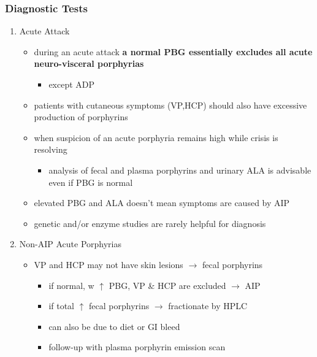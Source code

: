 \documentclass{scrartcl}
\begin{document}
\subsubsection{Diagnostic Tests}
\label{sec:orge03dab9}
\begin{enumerate}
\item Acute Attack
\label{sec:org96731fb}
\begin{itemize}
\item during an acute attack \textbf{a normal PBG essentially excludes all acute
neuro-visceral porphyrias}
\begin{itemize}
\item except ADP
\end{itemize}
\item patients with cutaneous symptoms (VP,HCP) should also have excessive
production of porphyrins
\item when suspicion of an acute porphyria remains high while crisis is
resolving
\begin{itemize}
\item analysis of fecal and plasma porphyrins and urinary ALA is
advisable even if PBG is normal
\end{itemize}
\item elevated PBG and ALA doesn't mean symptoms are caused by AIP
\item genetic and/or enzyme studies are rarely helpful for diagnosis
\end{itemize}

\item Non-AIP Acute Porphyrias
\label{sec:orga307fa3}
\begin{itemize}
\item VP and HCP may not have skin lesions \(\to\) fecal porphyrins
\begin{itemize}
\item if normal, w \(\uparrow\) PBG, VP \& HCP are excluded \(\to\) AIP
\item if total \(\uparrow\) fecal porphyrins \(\to\) fractionate by HPLC
\item can also be due to diet or GI bleed
\item follow-up with plasma porphyrin emission scan
\end{itemize}
\end{itemize}
\end{enumerate}
\end{document}
